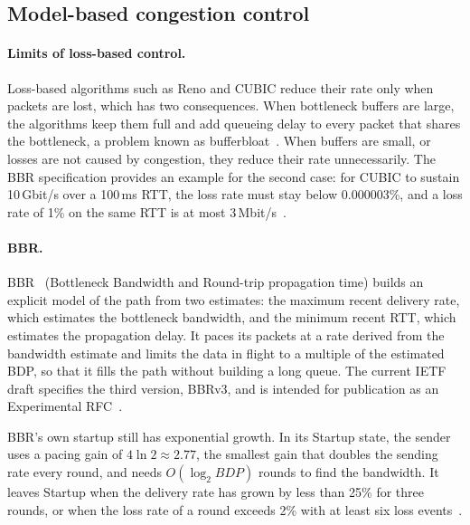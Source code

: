 \subsection{Model-based congestion control}\label{sec:rw-model}

\paragraph{Limits of loss-based control.} Loss-based algorithms such as Reno and CUBIC
reduce their rate only when packets are lost, which has
two consequences. When bottleneck buffers are large, the
algorithms keep them full and add queueing delay to every packet that shares the
bottleneck, a problem known as bufferbloat~\cite{gettys2012bufferbloat}. When buffers
are small, or losses are not caused by congestion, they reduce their rate
unnecessarily. The BBR specification provides an example for the second case: for CUBIC to sustain
10\,Gbit/s over a 100\,ms RTT, the loss rate must stay below 0.000003\%, and a loss
rate of 1\% on the same RTT is at most 3\,Mbit/s~\cite{cardwell2026bbrdraft}.

\paragraph{BBR.} BBR~\cite{cardwell2016bbr} (Bottleneck Bandwidth and Round-trip propagation time) builds an
explicit model of the path from two estimates: the maximum recent delivery rate, which
estimates the bottleneck bandwidth, and the minimum recent RTT, which estimates the
propagation delay. It paces its packets at a rate derived from
the bandwidth estimate and limits the data in flight to a multiple of the estimated
BDP, so that it fills the path without building a long queue. The current IETF draft
specifies the third version, BBRv3, and is
intended for publication as an Experimental RFC~\cite{cardwell2026bbrdraft}.

BBR's own startup still has exponential growth. In its Startup state, the sender uses
a pacing gain of $4\ln 2 \approx 2.77$, the smallest gain that doubles the sending rate
every round, and needs $O(\log_2 \mathit{BDP})$ rounds to find the
bandwidth. It leaves Startup when the delivery rate has
grown by less than 25\% for three rounds, or when the loss rate of a round exceeds 2\%
with at least six loss events~\cite{cardwell2026bbrdraft}.

